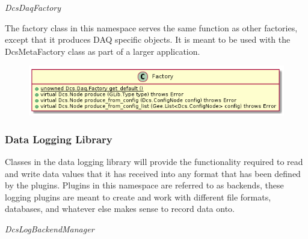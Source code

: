       \emph{DcsDaqFactory}

      \vspace*{-0.75cm}
      \begin{minipage}[t]{0.5\textwidth}
      	\vspace*{0.5cm}
        The factory class in this namespace serves the same function as other
        factories, except that it produces DAQ specific objects. It is meant to
        be used with the DcsMetaFactory class as part of a larger application.
      \end{minipage} \hfill
      \begin{minipage}[t]{0.45\textwidth}
        \begin{figure}[H]
          \includegraphics[width=\textwidth]{figures/design/class/daq/factory}
          \label{fig:dsg-classes-daq-factory}
        \end{figure}
      \end{minipage}

    \subsubsection{Data Logging Library}\label{sec:dsg-classes-log}

      Classes in the data logging library will provide the functionality
      required to read and write data values that it has received into any
      format that has been defined by the plugins. Plugins in this namespace are
      referred to as backends, these logging plugins are meant to create and
      work with different file formats, databases, and whatever else makes sense
      to record data onto.

      \emph{DcsLogBackendManager}

